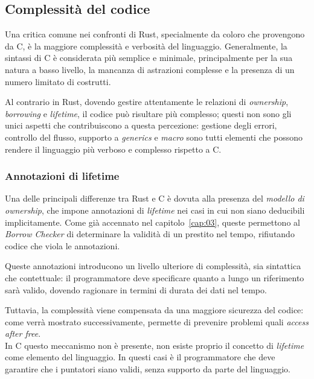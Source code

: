 \subsection{Complessità del codice}
Una critica comune nei confronti di Rust, specialmente da coloro che provengono da C, è la maggiore complessità e verbosità del linguaggio.
Generalmente, la sintassi di C è considerata più semplice e minimale, principalmente per la sua natura a basso livello, la mancanza di astrazioni
complesse e la presenza di un numero limitato di costrutti.

Al contrario in Rust, dovendo gestire attentamente le relazioni di \textit{ownership}, \textit{borrowing} e \textit{lifetime}, il codice può risultare più complesso; 
questi non sono gli unici aspetti che contribuiscono a questa percezione: gestione degli errori, controllo del flusso, supporto a \textit{generics} e \textit{macro} sono
tutti elementi che possono rendere il linguaggio più verboso e complesso rispetto a C.

\subsubsection{Annotazioni di lifetime}
Una delle principali differenze tra Rust e C è dovuta alla presenza del \textit{modello di ownership}, che impone annotazioni di \textit{lifetime} nei casi in cui non siano deducibili implicitamente.
Come già accennato nel capitolo~\ref{cap:03}, queste permettono al \textit{Borrow Checker} di determinare la validità di un prestito nel tempo, rifiutando 
codice che viola le annotazioni.

Queste annotazioni introducono un livello ulteriore di complessità, sia sintattica che contettuale: il programmatore deve specificare quanto a lungo
un riferimento sarà valido, dovendo ragionare in termini di durata dei dati nel tempo.

Tuttavia, la complessità viene compensata da una maggiore sicurezza del codice: come verrà mostrato successivamente, permette di prevenire
problemi quali \textit{access after free}. \hfill
\vspace{10pt} \\
\noindent In C questo meccanismo non è presente, non esiste proprio il concetto di \textit{lifetime} come elemento del linguaggio. In questi
casi è il programmatore che deve garantire che i puntatori siano validi, senza supporto da parte del linguaggio.

